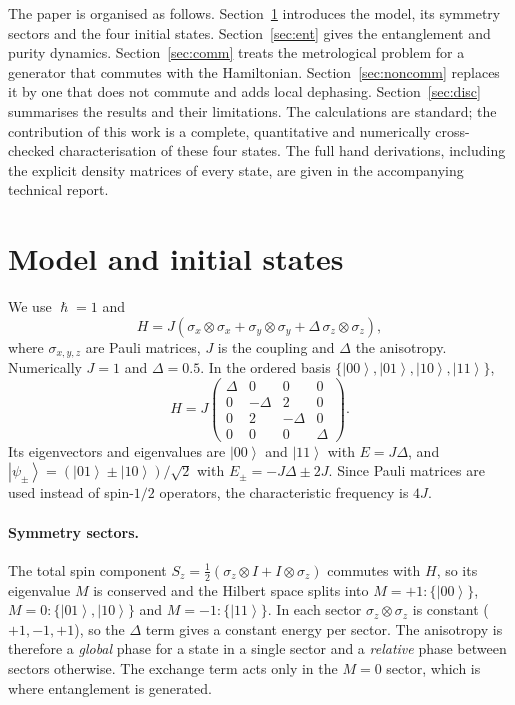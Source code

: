 \documentclass[10.5pt,a4paper]{article}
\newcommand{\ket}[1]{\left|#1\right\rangle}
\begin{document}
The paper is organised as follows. Section~\ref{sec:model} introduces the model, its symmetry sectors and the four initial states. Section~\ref{sec:ent} gives the entanglement and purity dynamics. Section~\ref{sec:comm} treats the metrological problem for a generator that commutes with the Hamiltonian. Section~\ref{sec:noncomm} replaces it by one that does not commute and adds local dephasing. Section~\ref{sec:disc} summarises the results and their limitations. The calculations are standard; the contribution of this work is a complete, quantitative and numerically cross-checked characterisation of these four states. The full hand derivations, including the explicit density matrices of every state, are given in the accompanying technical report.

\section{Model and initial states}\label{sec:model}

We use $\hslash=1$ and
\begin{equation}
  H=J\left(\sigma_x\otimes\sigma_x+\sigma_y\otimes\sigma_y+\Delta\,\sigma_z\otimes\sigma_z\right),
  \label{eq:H}
\end{equation}
where $\sigma_{x,y,z}$ are Pauli matrices, $J$ is the coupling and $\Delta$ the anisotropy. Numerically $J=1$ and $\Delta=0.5$. In the ordered basis $\{\ket{00},\ket{01},\ket{10},\ket{11}\}$,
\begin{equation}
  H=J\begin{pmatrix}\Delta&0&0&0\\0&-\Delta&2&0\\0&2&-\Delta&0\\0&0&0&\Delta\end{pmatrix}.
\end{equation}
Its eigenvectors and eigenvalues are $\ket{00}$ and $\ket{11}$ with $E=J\Delta$, and $\ket{\psi_\pm}=(\ket{01}\pm\ket{10})/\sqrt2$ with $E_\pm=-J\Delta\pm2J$. Since Pauli matrices are used instead of spin-$1/2$ operators, the characteristic frequency is $4J$.

\paragraph{Symmetry sectors.}
The total spin component $S_z=\tfrac12(\sigma_z\otimes I+I\otimes\sigma_z)$ commutes with $H$, so its eigenvalue $M$ is conserved and the Hilbert space splits into $M=+1:\{\ket{00}\}$, $M=0:\{\ket{01},\ket{10}\}$ and $M=-1:\{\ket{11}\}$. In each sector $\sigma_z\otimes\sigma_z$ is constant ($+1,-1,+1$), so the $\Delta$ term gives a constant energy per sector. The anisotropy is therefore a \emph{global} phase for a state in a single sector and a \emph{relative} phase between sectors otherwise. The exchange term acts only in the $M=0$ sector, which is where entanglement is generated.
\end{document}

